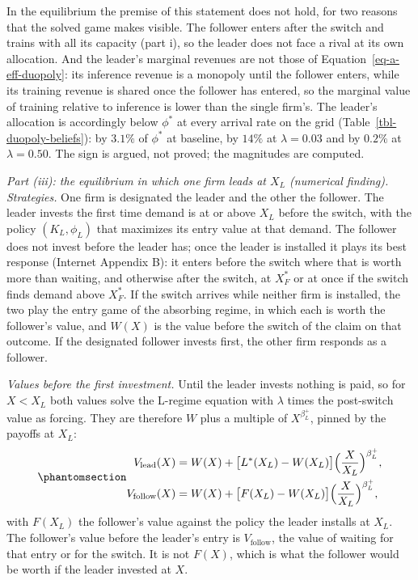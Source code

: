 \documentclass[
  11pt,
  letterpaper,
]{scrartcl}
\begin{document}
In the equilibrium the premise of this statement does not hold, for two
reasons that the solved game makes visible. The follower enters after
the switch and trains with all its capacity (part i), so the leader does
not face a rival at its own allocation. And the leader's marginal
revenues are not those of Equation~\ref{eq-a-eff-duopoly}: its inference
revenue is a monopoly until the follower enters, while its training
revenue is shared once the follower has entered, so the marginal value
of training relative to inference is lower than the single firm's. The
leader's allocation is accordingly below \(\phi^*\) at every arrival
rate on the grid (Table~\ref{tbl-duopoly-beliefs}): by \(3.1\%\) of
\(\phi^*\) at baseline, by \(14\%\) at \(\lambda = 0.03\) and by
\(0.2\%\) at \(\lambda = 0.50\). The sign is argued, not proved; the
magnitudes are computed.

\emph{Part (iii): the equilibrium in which one firm leads at \(X_L\)
(numerical finding).} \emph{Strategies.} One firm is designated the
leader and the other the follower. The leader invests the first time
demand is at or above \(X_L\) before the switch, with the policy
\((K_L, \phi_L)\) that maximizes its entry value at that demand. The
follower does not invest before the leader has; once the leader is
installed it plays its best response (Internet Appendix B): it enters
before the switch where that is worth more than waiting, and otherwise
after the switch, at \(X_F^*\) or at once if the switch finds demand
above \(X_F^*\). If the switch arrives while neither firm is installed,
the two play the entry game of the absorbing regime, in which each is
worth the follower's value, and \(W(X)\) is the value before the switch
of the claim on that outcome. If the designated follower invests first,
the other firm responds as a follower.

\emph{Values before the first investment.} Until the leader invests
nothing is paid, so for \(X < X_L\) both values solve the L-regime
equation with \(\lambda\) times the post-switch value as forcing. They
are therefore \(W\) plus a multiple of \(X^{\beta_L^+}\), pinned by the
payoffs at \(X_L\):
\begin{equation}\protect\phantomsection\label{eq-values-before-entry}{
\begin{aligned}
V_{\text{lead}}(X) &= W(X) + \bigl[L^*(X_L) - W(X_L)\bigr]\Bigl(\frac{X}{X_L}\Bigr)^{\beta_L^+}, \\
V_{\text{follow}}(X) &= W(X) + \bigl[F(X_L) - W(X_L)\bigr]\Bigl(\frac{X}{X_L}\Bigr)^{\beta_L^+},
\end{aligned}
}\end{equation} with \(F(X_L)\) the follower's value against the policy
the leader installs at \(X_L\). The follower's value before the leader's
entry is \(V_{\text{follow}}\), the value of waiting for that entry or
for the switch. It is not \(F(X)\), which is what the follower would be
worth if the leader invested at \(X\).
\end{document}
